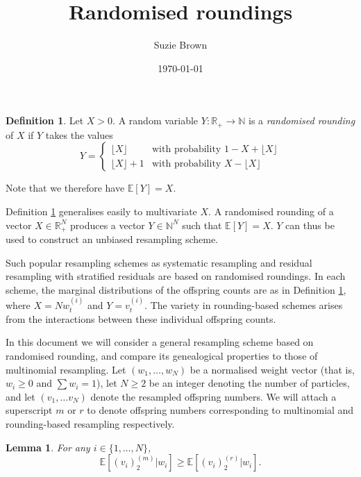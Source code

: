 \documentclass[fleqn]{article}
\title{Randomised roundings}
\author{Suzie Brown}
\date{\today}
\newtheorem{lemma}{Lemma}
\theoremstyle{definition}
\newtheorem{defn}{Definition}
\newcommand{\E}{\mathbb{E}}
\newcommand{\vt}[2][t]{v_{#1}^{(#2)}}
\newcommand{\wt}[2][t]{w_{#1}^{(#2)}}
\begin{document}
\maketitle
\thispagestyle{fancy}

\begin{defn}\label{defn:randround_1D}
Let $X>0$. A random variable $Y: \mathbb{R}_+ \to \mathbb{N}$ is a \emph{randomised rounding} of $X$ if $Y$ takes the values
\begin{equation*}
Y=
\begin{cases}
 \lfloor X \rfloor & \text{with probability } 1- X+ \lfloor X \rfloor \\
  \lfloor X \rfloor +1 & \text{with probability } X- \lfloor X \rfloor 
\end{cases}
\end{equation*}
\end{defn}
Note that we therefore have $\E[Y] =X$.

Definition \ref{defn:randround_1D} generalises easily to multivariate $X$. A randomised rounding of a vector $X \in \mathbb{R}_+^N$ produces a vector $Y \in \mathbb{N}^N$ such that $\E[Y]=X$. $Y$ can thus be used to construct an unbiased resampling scheme.

Such popular resampling schemes as systematic resampling and residual resampling with stratified residuals are based on randomised roundings. In each scheme, the marginal distributions of the offspring counts are as in Definition \ref{defn:randround_1D}, where $X=N\wt{i}$ and $Y=\vt{i}$. The variety in rounding-based schemes arises from the interactions between these individual offspring counts. 

In this document we will consider a general resampling scheme based on randomised rounding, and compare its genealogical properties to those of multinomial resampling.
Let $(w_1, \dots, w_N)$ be a normalised weight vector (that is, $w_i \geq 0$ and $\sum w_i = 1$), let $N\geq 2$ be an integer denoting the number of particles, and let $(v_1,\dots v_N)$ denote the resampled offspring numbers. We will attach a superscript $m$ or $r$ to denote offspring numbers corresponding to multinomial and rounding-based resampling respectively.

\begin{lemma}
For any $i \in \{1, \dots, N\}$,
\begin{equation*}
\E[(v_i)_2^{(m)} | w_i] \geq \E[(v_i)_2^{(r)} | w_i].
\end{equation*}
\end{lemma}
\end{document}
